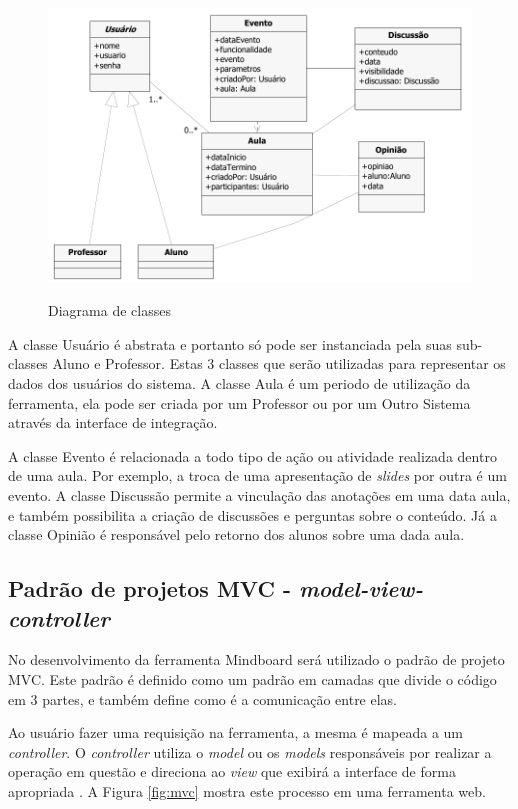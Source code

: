 \begin{figure}[!h]
\centering
\caption{Diagrama de classes}
\includegraphics[width=1.0\textwidth]{pdfs/img-class-diagram.pdf} 
\label{fig:class_diagram} 
\end{figure}

A classe Usuário é abstrata e portanto só pode ser instanciada pela suas sub-classes Aluno e Professor. Estas 3 classes que serão utilizadas para representar os dados dos usuários do sistema. A classe Aula é um periodo de utilização da ferramenta, ela pode ser criada por um Professor ou por um Outro Sistema através da interface de integração.

A classe Evento é relacionada a todo tipo de ação ou atividade realizada dentro de uma aula. Por exemplo, a troca de uma apresentação de \emph{slides} por outra é um evento. A classe Discussão permite a vinculação das anotações em uma data aula, e também possibilita a criação de discussões e perguntas sobre o conteúdo. Já a classe Opinião é responsável pelo retorno dos alunos sobre uma dada aula. 

\iffalse
\subsection{Padrão de projetos MVC - \emph{model-view-controller}}

No desenvolvimento da ferramenta Mindboard será utilizado o padrão de projeto MVC. Este padrão é definido como um padrão em camadas \cite{pressman} que divide o código em 3 partes, e também define como é a comunicação entre elas.

Ao usuário fazer uma requisição na ferramenta, a mesma é mapeada a um \emph{controller}. O \emph{controller} utiliza o \emph{model} ou os \emph{models} responsáveis por realizar a operação em questão e direciona ao \emph{view} que exibirá a interface de forma apropriada \cite{mvc}. A Figura \ref{fig:mvc} mostra este processo em uma ferramenta web.

